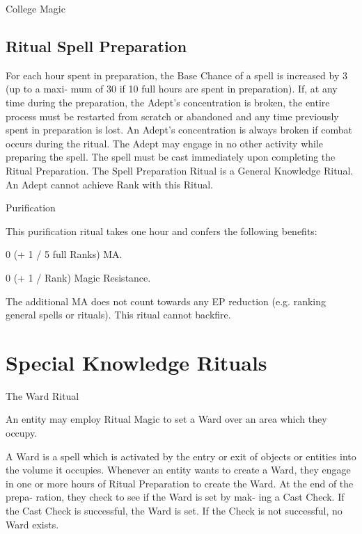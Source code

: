 \begin{Chapter}{College Magic}
\subsection{Ritual Spell Preparation}

For each hour spent in preparation, the Base Chance of a spell is
increased by 3 (up to a maxi- mum of 30 if 10 full hours are spent in
preparation).  If, at any time during the preparation, the Adept’s
concentration is broken, the entire process must be restarted from
scratch or abandoned and any time previously spent in preparation is
lost. An Adept’s concentration is always broken if combat occurs
during the ritual. The Adept may engage in no other activity while
preparing the spell.  The spell must be cast immediately upon
completing the Ritual Preparation.  The Spell Preparation Ritual is
a General Knowledge Ritual.  An Adept cannot achieve Rank with this
Ritual.


\begin{ritual}{Purification}

\begin{effects}
This purification ritual takes one hour and 
confers the following benefits:  
\begin{Itemize}
\item 0 (+ 1 / 5 full Ranks) MA.  

\item 0 (+ 1 / Rank) Magic Resistance. 
\end{Itemize}
The additional MA does not count towards any EP reduction (e.g.
ranking general spells or rituals).  This ritual cannot backfire.
\end{effects}
\end{ritual}


\section{Special Knowledge Rituals}

\begin{ritual}{The Ward Ritual}
\begin{effects}
An entity may employ Ritual Magic to set a Ward over an area which
they occupy.

A Ward is a spell which is activated by the entry or exit of objects
or entities into the volume it occupies.  Whenever an entity wants to
create a Ward, they engage in one or more hours of Ritual Preparation
to create the Ward. At the end of the prepa- ration, they check to see
if the Ward is set by mak- ing a Cast Check.  If the Cast Check is
successful, the Ward is set.  If the Check is not successful, no Ward
exists.


\end{effects}
\end{ritual}
\end{Chapter}
